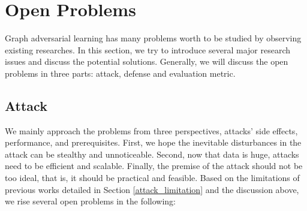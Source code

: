 
\section{Open Problems}
\label{openProblems}
Graph adversarial learning has many problems worth to be studied by observing existing researches. In this section, we try to introduce several major research issues and discuss the potential solutions. Generally, we will discuss the open problems in three parts: attack, defense and evaluation metric.

\subsection{Attack}
We mainly approach the problems from three perspectives, attacks' side effects, performance, and prerequisites. First, we hope the inevitable disturbances in the attack can be stealthy and unnoticeable. Second, now that data is huge, attacks need to be efficient and scalable. Finally, the premise of the attack should not be too ideal, that is, it should be practical and feasible. Based on the limitations of previous works detailed in Section \ref{attack_limitation} and the discussion above, we rise several open problems in the following:

